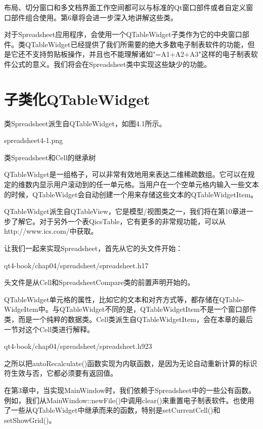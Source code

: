 \documentclass[11pt,oneside]{book}
\begin{document}
\begin{common-format}
布局、切分窗口和多文档界面工作空间都可以与标准的Qt窗口部件或者自定义窗口部件组合使用。第6章将会进一步深入地讲解这些类。

对于Spreadsheet应用程序，会使用一个QTableWidget子类作为它的中央窗口部件。类QTableWidget已经提供了我们所需要的绝大多数电子制表软件的功能，但是它还不支持剪贴板操作，并且也不能理解诸如"=A1+A2+A3"这样的电子制表软件公式的意义。我们将会在Spreadsheet类中实现这些缺少的功能。

\section{子类化QTableWidget}
类Spreadsheet派生自QTableWidget，如图4.1所示。
\begin{linefig}[0.5]{spreadsheet4-1.png}
\caption{类Spreadsheet和Cell的继承树}
\label{fig:spreadsheet4-1.png}
\end{linefig}

QTableWidget是一组格子，可以非常有效地用来表达二维稀疏数组。它可以在规定的维数内显示用户滚动到的任一单元格。当用户在一个空单元格内输入一些文本的时候，QTableWidget会自动创建一个用来存储这些文本的QTableWidgetItem。

QTableWidget派生自QTableView，它是模型/视图类之一，我们将在第10章进一步了解它。对于另外一个表QicsTable，它有更多的非常规功能，可以从http://www.ics.com/中获取。

让我们一起来实现Spreadsheet，首先从它的头文件开始：
\begin{cppline}{qt4-book/chap04/spreadsheet/spreadsheet.h}{1}{7}
\end{cppline}

头文件是从Cell和SpreadsheetCompare类的前置声明开始的。

QTableWidget单元格的属性，比如它的文本和对齐方式等，都存储在QTable-WidgeItem中。与QTableWidget不同的是，QTableWidgetItem不是一个窗口部件类，而是一个纯粹的数据类。Cell类派生自QTableWidgetItem，会在本章的最后一节对这个Cell类进行解释。

\begin{cppline}{qt4-book/chap04/spreadsheet/spreadsheet.h}{9}{23}
\end{cppline}

之所以把autoRecalculate()函数实现为内联函数，是因为无论自动重新计算的标识符生效与否，它都必须要有返回值。

在第3章中，当实现MainWindow时，我们依赖于Spreadsheet中的一些公有函数。例如，我们从MainWindow::newFile()中调用clear()来重置电子制表软件。也使用了一些从QTableWidget中继承而来的函数，特别是setCurrentCell()和setShowGrid()。


\end{common-format}
\end{document}

